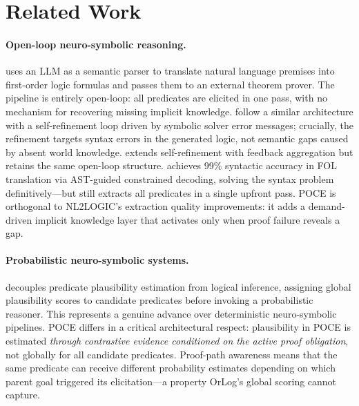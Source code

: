 \documentclass[11pt,letterpaper]{article}
\begin{document}
\section{Related Work}

\paragraph{Open-loop neuro-symbolic reasoning.}
\citet{Olausson2023} uses an LLM as a semantic parser to translate natural language premises into first-order logic formulas and passes them to
an external theorem prover. The pipeline is entirely open-loop: all predicates are elicited in one pass, with no mechanism
for recovering missing implicit knowledge. \citet{Pan2023} follow a similar architecture with a self-refinement loop driven
by symbolic solver error messages; crucially, the refinement targets syntax errors in the generated logic, not semantic
gaps caused by absent world knowledge. \citet{Kirtania2024} extends self-refinement with feedback aggregation but retains the
same open-loop structure. \citet{Putra2026} achieves 99\% syntactic accuracy in FOL translation via AST-guided constrained decoding,
solving the syntax problem definitively---but still extracts all predicates in a single upfront pass. POCE is orthogonal
to NL2LOGIC's extraction quality improvements: it adds a demand-driven implicit knowledge layer that activates only when
proof failure reveals a gap.

\paragraph{Probabilistic neuro-symbolic systems.}
\citet{Hoveyda2026} decouples predicate plausibility
estimation from logical inference, assigning global plausibility scores to candidate predicates before invoking a probabilistic
reasoner. This represents a genuine advance over deterministic neuro-symbolic pipelines. POCE differs in a critical architectural
respect: plausibility in POCE is estimated \emph{through contrastive evidence conditioned on the active proof obligation},
not globally for all candidate predicates. Proof-path awareness means that the same predicate can receive different probability
estimates depending on which parent goal triggered its elicitation---a property OrLog's global scoring cannot capture.
\end{document}
